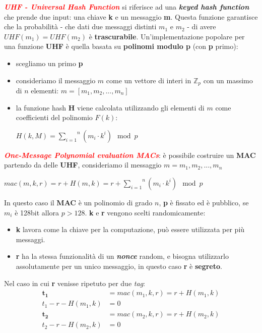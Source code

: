 \begin{flushleft}
    \textcolor{red}{\textbf{\textit{UHF - Universal Hash Function}}} si riferisce ad una \textbf{\textit{keyed hash function}} che prende due input: una chiave \textbf{k} e un messaggio \textbf{m}. Questa funzione garantisce che la probabilità - che dati due messaggi distinti $m_1$ e $m_2$ - di avere $UHF(m_1) = UHF(m_2)$ è \textbf{trascurabile}. Un'implementazione popolare per una funzione \textbf{UHF} è quella basata su \textbf{polinomi modulo p} (con \textbf{p} primo):
    \begin{itemize}[nosep]
        \item scegliamo un primo \textbf{p}
        \item consideriamo il messaggio $m$ come un vettore di interi in $\mathbb{Z}_p$ con un massimo di $n$ elementi: $m = [m_1, m_2, ..., m_n]$
        \item la funzione hash \textbf{H} viene calcolata utilizzando gli elementi di $m$ come coefficienti del polinomio $F(k)$:
        
        {\centering
            $H(k, M) = \overset{n}{\underset{i=1}{\sum}} (m_i \cdot k^i) \mod p$
        \par}

    \end{itemize}

    \medskip
    
    \textcolor{red}{\textbf{\textit{One-Message Polynomial evaluation MACs}}}: è possibile costruire un \textbf{MAC} partendo da delle \textbf{UHF}, consideriamo il messaggio $m = m_1, m_2, ..., m_n$

    {\centering
        $mac(m, k, r) = r + H(m, k) = r + \overset{n}{\underset{i=1}{\sum}} (m_i \cdot k^i) \mod p$
    \par}

    In questo caso il \textbf{MAC} è un polinomio di grado $n$, \textbf{p} è fissato ed è pubblico, se $m_i$ è 128bit allora $p > 128$. \textbf{k} e \textbf{r} vengono scelti randomicamente:
    \begin{itemize}[nosep]
        \item \textbf{k} lavora come la chiave per la computazione, può essere utilizzata per più messaggi.
        \item \textbf{r} ha la stessa funzionalità di un \textbf{\textit{nonce}} random, e bisogna utilizzarlo assolutamente per un unico messaggio, in questo caso \textbf{r} è \textbf{segreto}.
    \end{itemize}
    Nel caso in cui \textbf{r} venisse ripetuto per due \textit{tag}:
    \begin{align*}
        \mathbf{t_1} &= mac(m_1, k, r) = r + H(m_1, k) \\
        t_1 - r - H(m_1, k) &= 0 \\
        \mathbf{t_2} &= mac(m_2, k, r) = r + H(m_2, k) \\
        t_2 - r - H(m_2, k) &= 0
    \end{align*}


\end{flushleft}
